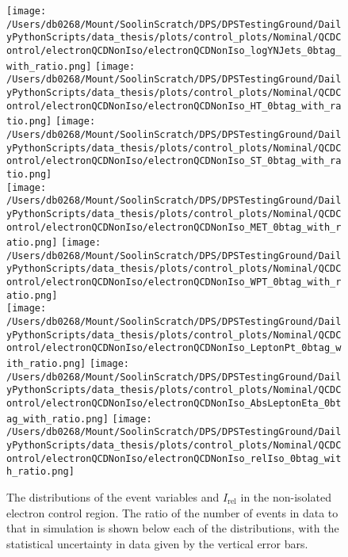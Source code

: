 \begin{figure}[hp!]
	\centering
	\texttt{[image: /Users/db0268/Mount/SoolinScratch/DPS/DPSTestingGround/DailyPythonScripts/data\_thesis/plots/control\_plots/Nominal/QCDControl/electronQCDNonIso/electronQCDNonIso\_logYNJets\_0btag\_with\_ratio.png]}
	\texttt{[image: /Users/db0268/Mount/SoolinScratch/DPS/DPSTestingGround/DailyPythonScripts/data\_thesis/plots/control\_plots/Nominal/QCDControl/electronQCDNonIso/electronQCDNonIso\_HT\_0btag\_with\_ratio.png]}
	\texttt{[image: /Users/db0268/Mount/SoolinScratch/DPS/DPSTestingGround/DailyPythonScripts/data\_thesis/plots/control\_plots/Nominal/QCDControl/electronQCDNonIso/electronQCDNonIso\_ST\_0btag\_with\_ratio.png]} \\
	\texttt{[image: /Users/db0268/Mount/SoolinScratch/DPS/DPSTestingGround/DailyPythonScripts/data\_thesis/plots/control\_plots/Nominal/QCDControl/electronQCDNonIso/electronQCDNonIso\_MET\_0btag\_with\_ratio.png]}
	\texttt{[image: /Users/db0268/Mount/SoolinScratch/DPS/DPSTestingGround/DailyPythonScripts/data\_thesis/plots/control\_plots/Nominal/QCDControl/electronQCDNonIso/electronQCDNonIso\_WPT\_0btag\_with\_ratio.png]} \\
	\texttt{[image: /Users/db0268/Mount/SoolinScratch/DPS/DPSTestingGround/DailyPythonScripts/data\_thesis/plots/control\_plots/Nominal/QCDControl/electronQCDNonIso/electronQCDNonIso\_LeptonPt\_0btag\_with\_ratio.png]} 
	\texttt{[image: /Users/db0268/Mount/SoolinScratch/DPS/DPSTestingGround/DailyPythonScripts/data\_thesis/plots/control\_plots/Nominal/QCDControl/electronQCDNonIso/electronQCDNonIso\_AbsLeptonEta\_0btag\_with\_ratio.png]}
	\texttt{[image: /Users/db0268/Mount/SoolinScratch/DPS/DPSTestingGround/DailyPythonScripts/data\_thesis/plots/control\_plots/Nominal/QCDControl/electronQCDNonIso/electronQCDNonIso\_relIso\_0btag\_with\_ratio.png]}
	\caption[The distributions of the event variables and $I_{\mathrm{rel}}$ in the non-isolated electron control region. The ratio of the number of events in data to that in simulation is shown below each of the distributions, with the statistical uncertainty in data given by the vertical error bars.]{The distributions of the event variables and $I_{\mathrm{rel}}$ in the non-isolated electron control region. The ratio of the number of events in data to that in simulation is shown below each of the distributions, with the statistical uncertainty in data given by the vertical error bars.}
	\label{fig:QCDeNonIso}
\end{figure}
